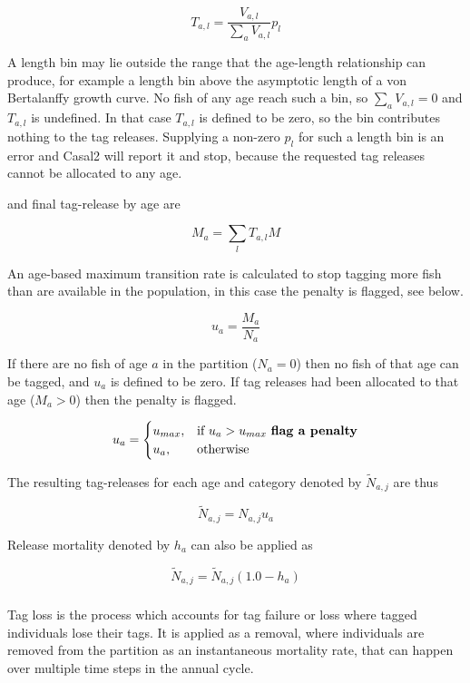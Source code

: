 $$ T_{a,l}= \frac{V_{a,l}}{\sum_a V_{a,l}} {p}_l$$

A length bin may lie outside the range that the age-length relationship can produce, for example a length bin above the asymptotic length of a von Bertalanffy growth curve. No fish of any age reach such a bin, so $\sum_a V_{a,l} = 0$ and $T_{a,l}$ is undefined. In that case $T_{a,l}$ is defined to be zero, so the bin contributes nothing to the tag releases. Supplying a non-zero ${p}_l$ for such a length bin is an error and Casal2 will report it and stop, because the requested tag releases cannot be allocated to any age.

and final tag-release by age are

$$ M_{a} = \sum_l T_{a,l}M  $$

An age-based maximum transition rate is calculated to stop tagging more fish than are available in the population, in this case the penalty is flagged, see below.

$$ u_{a} = \frac{ M_{a} }{ N_{a}}  $$

If there are no fish of age \(a\) in the partition (\(N_{a} = 0\)) then no fish of that age can be tagged, and $u_{a}$ is defined to be zero. If tag releases had been allocated to that age (\(M_{a} > 0\)) then the penalty is flagged.

$$
u_{a} =
\begin{cases}
u_{max},& \text{if } u_{a} > u_{max} \text{ \textbf{flag a penalty}}\\
u_{a},  & \text{otherwise}
\end{cases}
$$

The resulting tag-releases for each age and category denoted by \(\widetilde{N}_{a,j}\) are thus

$$
\widetilde{N}_{a,j} = N_{a,j} u_{a}
$$

Release mortality denoted by \(h_a\) can also be applied as

$$\widetilde{N}_{a,j} = \widetilde{N}_{a,j}\left(1.0 - h_a\right)$$

\subsubsection{}\label{sec:Process-TagLoss} 

Tag loss is the process which accounts for tag failure or loss where tagged individuals lose their tags. It is applied as a removal, where individuals are removed from the partition as an instantaneous mortality rate, that can happen over multiple time steps in the annual cycle. 

